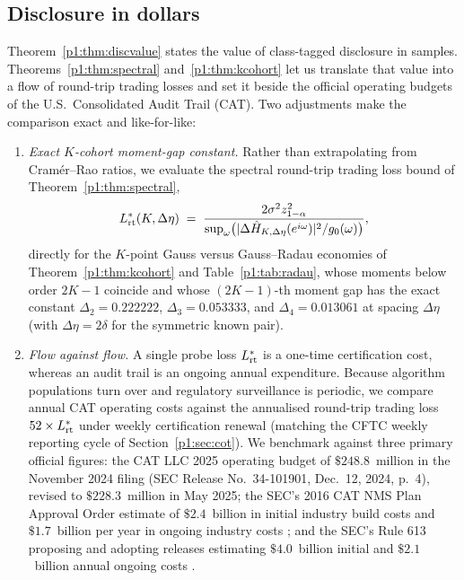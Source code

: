 \subsection{Disclosure in dollars}\label{p1:sec:disc_dollars}

Theorem~\ref{p1:thm:discvalue} states the value of class-tagged disclosure in samples. Theorems~\ref{p1:thm:spectral} and~\ref{p1:thm:kcohort} let us translate that value into a flow of round-trip trading losses and set it beside the official operating budgets of the U.S.\ Consolidated Audit Trail (CAT). Two adjustments make the comparison exact and like-for-like:
\begin{enumerate}[label=(\roman*),itemsep=1pt]
\item \emph{Exact $K$-cohort moment-gap constant.} Rather than extrapolating from Cram\'er--Rao ratios, we evaluate the spectral round-trip trading loss bound of Theorem~\ref{p1:thm:spectral},
\[
L_{\rm rt}^*(K,\Delta\eta)\;=\;\frac{2\sigma^2 z_{1-\alpha}^2}{\sup_\omega\bigl(|\Delta\hat H_{K,\Delta\eta}(e^{i\omega})|^2/g_0(\omega)\bigr)},
\]
directly for the $K$-point Gauss versus Gauss--Radau economies of Theorem~\ref{p1:thm:kcohort} and Table~\ref{p1:tab:radau}, whose moments below order $2K-1$ coincide and whose $(2K-1)$-th moment gap has the exact constant $\Delta_2=0.222222$, $\Delta_3=0.053333$, and $\Delta_4=0.013061$ at spacing $\Delta\eta$ (with $\Delta\eta=2\delta$ for the symmetric known pair).
\item \emph{Flow against flow.} A single probe loss $L_{\rm rt}^*$ is a one-time certification cost, whereas an audit trail is an ongoing annual expenditure. Because algorithm populations turn over and regulatory surveillance is periodic, we compare annual CAT operating costs against the annualised round-trip trading loss $52\times L_{\rm rt}^*$ under weekly certification renewal (matching the CFTC weekly reporting cycle of Section~\ref{p1:sec:cot}). We benchmark against three primary official figures: the CAT LLC 2025 operating budget of $\$248.8$~million in the November 2024 filing (SEC Release No.\ 34-101901, Dec.\ 12, 2024, p.~4), revised to $\$228.3$~million in May 2025; the SEC's 2016 CAT NMS Plan Approval Order estimate of $\$2.4$~billion in initial industry build costs and $\$1.7$~billion per year in ongoing industry costs \citep[Release No.\ 34-79318, Nov.\ 15, 2016, 81 FR 84696 at 84801, p.~363]{p1:sec2016}; and the SEC's Rule 613 proposing and adopting releases estimating $\$4.0$~billion initial and $\$2.1$~billion annual ongoing costs \citep[Release No.\ 34-62174, May 26, 2010, 75 FR 32556 at 32598, 32600, pp.~147, 153; Release No.\ 34-67457, July 18, 2012, 77 FR 45722 at 45790--45795, pp.~220--238]{p1:sec2012}.
\end{enumerate}

